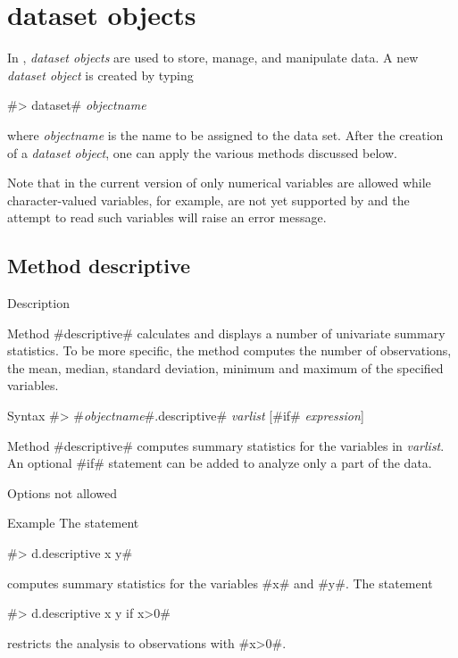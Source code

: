 \chapter{dataset objects} 
 \label{chap_data}
 \label{datasetobj} 

In \BayesX, {\em dataset objects} are used to store, manage, and manipulate data. A new {\em dataset object} is created by typing

 #> dataset# {\em objectname}

where {\em objectname} is the name to be assigned to the data set. After the creation of a {\em dataset object}, one can apply the various methods discussed below.

Note that in the current version of \BayesX only numerical variables are allowed while character-valued variables, for example, are not yet supported by \BayesX and the attempt to read such variables will raise an error message.

\section{Method descriptive} 
 \label{descriptive} 

\begin{stanza}{Description}

Method #descriptive# calculates and displays a number of univariate summary statistics. To be more specific, the method computes the number of observations, the mean, median, standard deviation, minimum and maximum of the specified variables.
\end{stanza}

\begin{stanza}{Syntax}
 #> #{\em objectname}#.descriptive# {\em varlist} [#if# {\em expression}]

Method #descriptive# computes summary statistics for the variables in {\em varlist}. An optional #if# statement can be added to analyze only a part of the data.
\end{stanza}

\begin{stanza}{Options}
 not allowed
\end{stanza}

\begin{stanza}{Example}
The statement

#> d.descriptive x y#

computes summary statistics for the variables #x# and #y#. The statement

#> d.descriptive x y if x>0#

restricts the analysis to observations with #x>0#.
\end{stanza}


